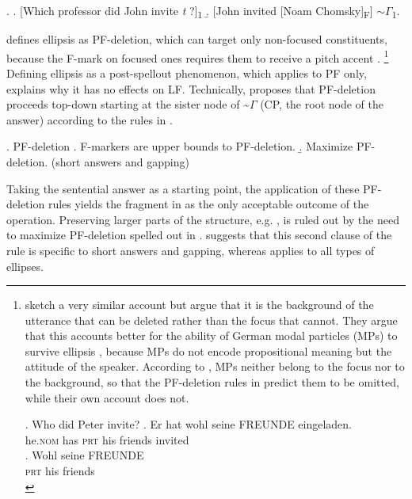 \ex. \a. [Which professor did John invite \textit{t} ?]\textsubscript{1} \hfill \citep[472]{reich2007}
\b. [John invited [Noam Chomsky]\textsubscript{F}]  $\sim\Gamma$\textsubscript{1}.

\citet{reich2007} defines ellipsis as PF-deletion, which can target only non-focused constituents, because the F-mark on focused ones requires them to receive a pitch accent \citep{selkirk1984}.%
%
\footnote{\label{fn-ott-struckmeier}
\citet{ott.struckmeier2016} sketch a very similar account but argue that it is the background of the utterance that can be deleted rather than the focus that cannot. They argue that this accounts better for the ability of German modal particles (MPs) to survive ellipsis \Next, because MPs do not encode propositional meaning but the attitude of the speaker. According to \citeauthor{ott.struckmeier2016}, MPs neither belong to the focus nor to the background, so that the PF-deletion rules in \citet{reich2007} predict them to be omitted, while their own account does not.

\ex. Who did Peter invite? \hfill\citep[227--228]{ott.struckmeier2016}
\ag. Er hat wohl seine FREUNDE eingeladen.\\
    he.\textsc{nom} has \textsc{prt} his friends invited\\
\bg. Wohl seine FREUNDE \\
    \textsc{prt} his friends\\

}\afterfn%
%
Defining ellipsis as a post-spellout phenomenon, which applies to PF only, explains why it has no effects on LF. Technically, \citeauthor{reich2007} proposes that PF-deletion proceeds top-down starting at the sister node of \~$\Gamma$ (CP, the root node of the answer) according to the rules in \Next.

\ex. PF-deletion \hfill \citep[473]{reich2007}
\a. F-markers are upper bounds to PF-deletion.
\b. Maximize PF-deletion. \hfill (short answers and gapping)

\largerpage
Taking the sentential answer \LLast[b] as a starting point, the application of these PF-deletion rules yields the fragment in \Next[a] as the only acceptable outcome of the operation. Preserving larger parts of the structure, e.g. \Next[b], is ruled out by the need to maximize PF-deletion spelled out in \Last[b]. \citeauthor{reich2007} suggests that this second clause of the rule is specific to short answers and gapping, whereas \Last[a] applies to all types of ellipses.

